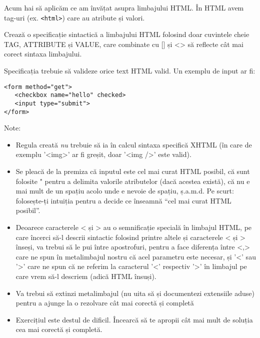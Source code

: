 \begin{Exercise}[title={Sintaxa HTML},label={ex:sintaxa_html},difficulty=3]
Acum hai să aplicăm ce am învățat asupra limbajului HTML. În HTML avem
tag-uri (ex. \texttt{<html>}) care au atribute și valori.

\Question Crează o specificație sintactică a limbajului HTML folosind
doar cuvintele cheie TAG, ATTRIBUTE și VALUE, care combinate
cu [] și <> să reflecte cât mai corect sintaxa limbajului.

Specificația trebuie să valideze orice text HTML valid.
Un exemplu de input ar fi:
\begin{verbatim}
<form method="get">
   <checkbox name="hello" checked>
   <input type="submit">
</form>
\end{verbatim}
\ExeText
Note:
\begin{itemize}
\item Regula creată \textit{nu} trebuie să ia în calcul sintaxa
specifică XHTML (în care de exemplu '<img>' ar fi greșit, doar '<img />' este valid).
\item Se pleacă de la premiza că inputul este cel mai curat HTML posibil, că
sunt folosite " pentru a delimita valorile atributelor (dacă acestea există), că
nu e mai mult de un spațiu acolo unde e nevoie de spațiu, ș.a.m.d. Pe scurt:
folosește-ți intuiția pentru a decide ce înseamnă ``cel mai curat HTML posibil''.
\item Deoarece caracterele < și > au o semnificație specială în limbajul HTML, pe
care încerci să-l descrii sintactic folosind printre altele
și caracterele < și > înseși, va trebui să le pui între apostrofuri, pentru a face
diferența între <,> care ne spun în metalimbajul nostru
că acel parametru este necesar, și '<' sau '>' care
ne spun că ne referim la caracterul '<' respectiv '>' în limbajul pe care
vrem să-l descriem (adică HTML însuși).
\item Va trebui să extinzi metalimbajul (nu uita să și documentezi extensiile aduse)
pentru a ajunge la o rezolvare cât mai corectă și completă
\item Exercițiul este destul de dificil. Încearcă să te apropii cât mai mult de soluția
cea mai corectă și completă.
\end{itemize}
\end{Exercise}
